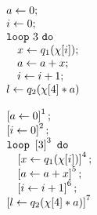 %
{
\begin{figure}
\centering
\begin{subfigure}{.2\textwidth}
\begin{centering}
$
\begin{array}{l}
   a \leftarrow 0; \\
   i \leftarrow 0 ; \\
    \mathtt{loop} ~ 3 ~ \mathtt{do} ~ \\
    \quad
     x \leftarrow q_1(\chi[i])   ; \\
    \quad a \leftarrow a+x; \\
        \quad i \leftarrow i+1; \\
    l \leftarrow q_2(\chi[4]*a)\\
\end{array}
$
\caption{}
\end{centering}
\end{subfigure}
\quad
\begin{subfigure}{.2\textwidth}
\begin{centering}
$
\begin{array}{l}
   \left[  a \leftarrow 0 \right]^{1}; \\
   \left[  i \leftarrow 0 \right]^{2} ; \\
    \mathtt{loop} ~ \left[ 3 \right]^{3} ~ \mathtt{do} ~ \\
    \quad
    \left[  x \leftarrow q_1(\chi[i]) \right]^{4}   ; \\
    \quad \left[ a \leftarrow a+x \right]^{5}; \\
        \quad \left[ i \leftarrow i+1 \right]^{6}; \\
    \left[ l \leftarrow q_2(\chi[4]*a) \right]^{7}\\
\end{array}
$
\caption{}
\end{centering}
\end{subfigure}
\begin{subfigure}{.55\textwidth}
\qquad
{}
\end{subfigure}
\end{figure}}
